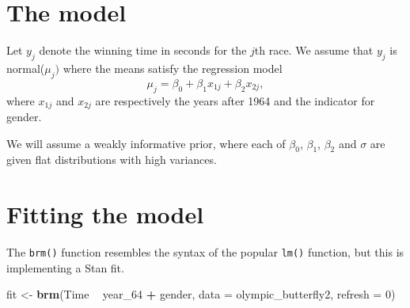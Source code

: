 \documentclass[
]{book}
\newenvironment{Shaded}{\begin{snugshade}}{\end{snugshade}}
\newcommand{\DataTypeTok}[1]{\textcolor[rgb]{0.13,0.29,0.53}{#1}}
\newcommand{\DecValTok}[1]{\textcolor[rgb]{0.00,0.00,0.81}{#1}}
\newcommand{\KeywordTok}[1]{\textcolor[rgb]{0.13,0.29,0.53}{\textbf{#1}}}
\newcommand{\NormalTok}[1]{#1}
\newcommand{\OperatorTok}[1]{\textcolor[rgb]{0.81,0.36,0.00}{\textbf{#1}}}
\newcommand{\OtherTok}[1]{\textcolor[rgb]{0.56,0.35,0.01}{#1}}
\newcommand{\StringTok}[1]{\textcolor[rgb]{0.31,0.60,0.02}{#1}}
\begin{document}
\begin{Shaded}
\end{Shaded}

\hypertarget{the-model}{%
\section{The model}\label{the-model}}

Let \(y_j\) denote the winning time in seconds for the \(j\)th race. We assume that \(y_j\) is normal(\(\mu_j)\) where the means satisfy the regression model
\[
\mu_j = \beta_0 + \beta_1 x_{1j} + \beta_2 x_{2j},
\]
where \(x_{1j}\) and \(x_{2j}\) are respectively the years after 1964 and the indicator for gender.

We will assume a weakly informative prior, where each of \(\beta_0\), \(\beta_1\), \(\beta_2\) and \(\sigma\) are given flat distributions with high variances.

\hypertarget{fitting-the-model}{%
\section{Fitting the model}\label{fitting-the-model}}

The \texttt{brm()} function resembles the syntax of the popular \texttt{lm()} function, but this is implementing a Stan fit.

\begin{Shaded}
\begin{Highlighting}[]
\NormalTok{fit <-}\StringTok{ }\KeywordTok{brm}\NormalTok{(Time }\OperatorTok{~}\StringTok{ }\NormalTok{year_}\DecValTok{64} \OperatorTok{+}\StringTok{ }\NormalTok{gender,}
           \DataTypeTok{data =}\NormalTok{ olympic_butterfly2,}
           \DataTypeTok{refresh =} \DecValTok{0}\NormalTok{)}
\end{Highlighting}
\end{Shaded}
\end{document}
